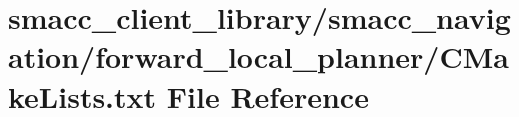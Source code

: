 \hypertarget{client__library_2smacc__navigation_2forward__local__planner_2CMakeLists_8txt}{}\section{smacc\+\_\+client\+\_\+library/smacc\+\_\+navigation/forward\+\_\+local\+\_\+planner/\+C\+Make\+Lists.txt File Reference}
\label{client__library_2smacc__navigation_2forward__local__planner_2CMakeLists_8txt}
